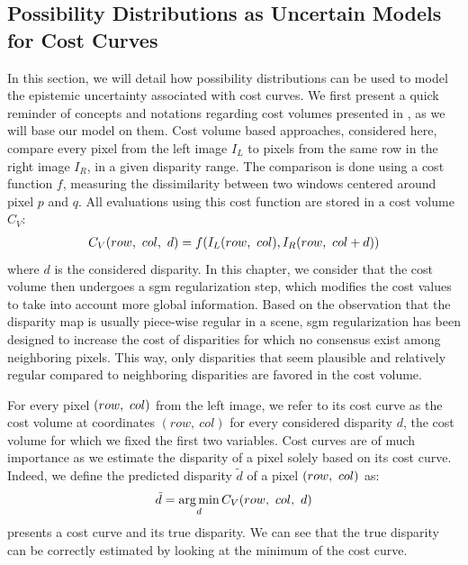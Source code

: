 \subsection{Possibility Distributions as Uncertain Models for Cost Curves}
In this section, we will detail how possibility distributions can be used to model the epistemic uncertainty associated with cost curves. We first present a quick reminder of concepts and notations regarding cost volumes presented in , as we will base our model on them. Cost volume based approaches, considered here, compare every pixel from the left image $I_L$ to pixels from the same row in the right image $I_R$, in a given disparity range. The comparison is done using a cost function $f$, measuring the dissimilarity between two windows centered around pixel $p$ and $q$. All evaluations using this cost function are stored in a cost volume $C_V$:
\begin{align}
	C_V(row, ~col, ~d) = f(I_L(row, ~col), I_R(row, ~col+d))
\end{align}
where $d$ is the considered disparity. In this chapter, we consider that the cost volume then undergoes a \acrshort{sgm} regularization step, which modifies the cost values to take into account more global information. Based on the observation that the disparity map is usually piece-wise regular in a scene, \acrshort{sgm} regularization has been designed to increase the cost of disparities for which no consensus exist among neighboring pixels. This way, only disparities that seem plausible and relatively regular compared to neighboring disparities are favored in the cost volume.

For every pixel $(row, ~col)$ from the left image, we refer to its cost curve as the cost volume at coordinates $(row,~col)$ for every considered disparity $d$, \ie the cost volume for which we fixed the first two variables. Cost curves are of much importance as we estimate the disparity of a pixel solely based on its cost curve. Indeed, we define the predicted disparity $\tilde{d}$ of a pixel $(row, ~col)$ as:
\begin{align}
	\tilde{d} = \operatorname*{arg\,min}_d C_V(row, ~col, ~d)
\end{align} 
 presents a cost curve and its true disparity. We can see that the true disparity can be correctly estimated by looking at the minimum of the cost curve.
 
